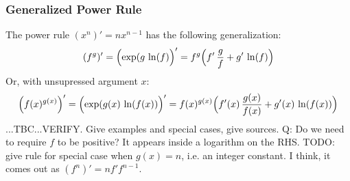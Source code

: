 

\subsubsection{Generalized Power Rule} 
The power rule $(x^n)' = n x^{n-1}$ has the following generalization:
\begin{equation}
 (f^g)' = \Bigl( \exp(g \, \ln(f) \Bigr) '
        = f^g \Bigl(f ' \, \frac{g}{f} + g' \, \ln(f) \Bigr)
\end{equation}
Or, with unsupressed argument $x$:
\begin{equation}
 \Bigl(f(x)^{g(x)}\Bigr)' 
 = \Bigl( \exp(g(x) \, \ln(f(x)) \Bigr) '
 = f(x)^{g(x)} \Bigl(f'(x) \, \frac{g(x)}{f(x)} + g'(x) \, \ln(f(x)) \Bigr)
\end{equation}
...TBC...VERIFY. Give examples and special cases, give sources. Q: Do we need to require $f$ to be positive? It appears inside a logarithm on the RHS. TODO: give rule for special case when $g(x) = n$, i.e. an integer constant. I think, it comes out as $(f^n)' = n f' f^{n-1}$.

%
%


